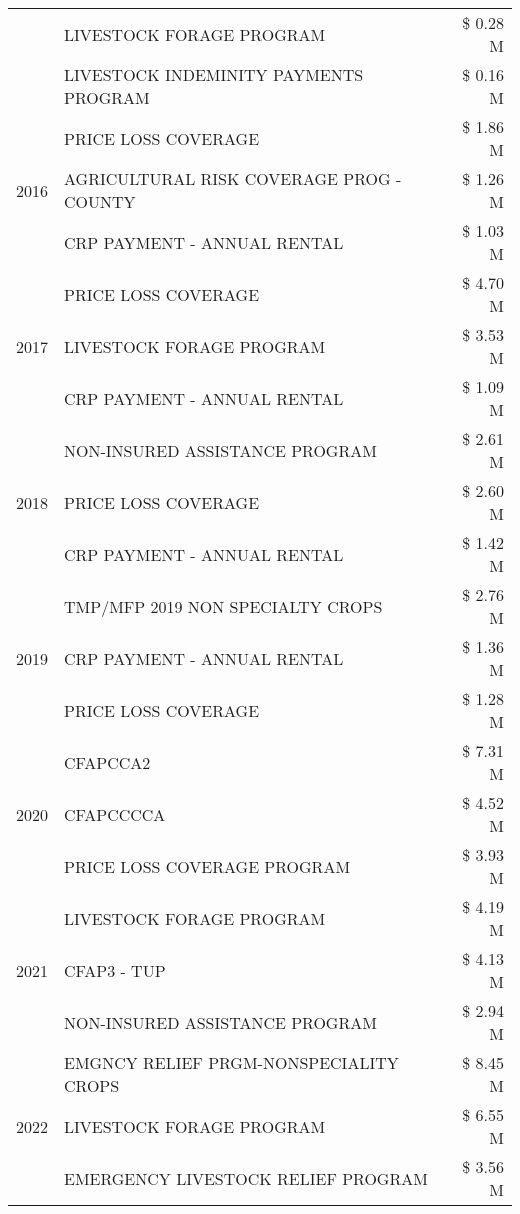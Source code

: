 \begin{tabular}{llr}
 & LIVESTOCK FORAGE PROGRAM & \$ 0.28 M \\
 & LIVESTOCK INDEMINITY PAYMENTS PROGRAM & \$ 0.16 M \\
\cline{1-3}
\multirow[t]{3}{*}{2016} & PRICE LOSS COVERAGE & \$ 1.86 M \\
 & AGRICULTURAL RISK COVERAGE PROG - COUNTY & \$ 1.26 M \\
 & CRP PAYMENT - ANNUAL RENTAL & \$ 1.03 M \\
\cline{1-3}
\multirow[t]{3}{*}{2017} & PRICE LOSS COVERAGE & \$ 4.70 M \\
 & LIVESTOCK FORAGE PROGRAM & \$ 3.53 M \\
 & CRP PAYMENT - ANNUAL RENTAL & \$ 1.09 M \\
\cline{1-3}
\multirow[t]{3}{*}{2018} & NON-INSURED ASSISTANCE PROGRAM & \$ 2.61 M \\
 & PRICE LOSS COVERAGE & \$ 2.60 M \\
 & CRP PAYMENT - ANNUAL RENTAL & \$ 1.42 M \\
\cline{1-3}
\multirow[t]{3}{*}{2019} & TMP/MFP 2019 NON SPECIALTY CROPS & \$ 2.76 M \\
 & CRP PAYMENT - ANNUAL RENTAL & \$ 1.36 M \\
 & PRICE LOSS COVERAGE & \$ 1.28 M \\
\cline{1-3}
\multirow[t]{3}{*}{2020} & CFAPCCA2 & \$ 7.31 M \\
 & CFAPCCCCA & \$ 4.52 M \\
 & PRICE LOSS COVERAGE PROGRAM & \$ 3.93 M \\
\cline{1-3}
\multirow[t]{3}{*}{2021} & LIVESTOCK FORAGE PROGRAM & \$ 4.19 M \\
 & CFAP3 - TUP & \$ 4.13 M \\
 & NON-INSURED ASSISTANCE PROGRAM & \$ 2.94 M \\
\cline{1-3}
\multirow[t]{3}{*}{2022} & EMGNCY RELIEF PRGM-NONSPECIALITY CROPS & \$ 8.45 M \\
 & LIVESTOCK FORAGE PROGRAM & \$ 6.55 M \\
 & EMERGENCY LIVESTOCK RELIEF PROGRAM & \$ 3.56 M \\
\cline{1-3}
\bottomrule
\end{tabular}
